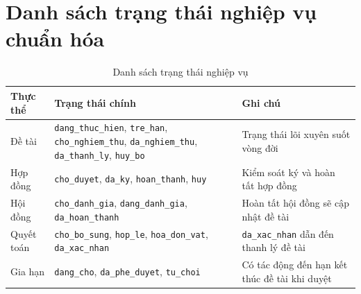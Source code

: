 \documentclass[12pt,a4paper]{report}
\begin{document}
\section{Danh sách trạng thái nghiệp vụ chuẩn hóa}
\begin{table}[H]
\centering
\begin{tabular}{|L{3.2cm}|L{4.6cm}|L{5.0cm}|}
\hline
\textbf{Thực thể} & \textbf{Trạng thái chính} & \textbf{Ghi chú} \\ \hline
Đề tài & \texttt{dang\_thuc\_hien}, \texttt{tre\_han}, \texttt{cho\_nghiem\_thu}, \texttt{da\_nghiem\_thu}, \texttt{da\_thanh\_ly}, \texttt{huy\_bo} & Trạng thái lõi xuyên suốt vòng đời \\ \hline
Hợp đồng & \texttt{cho\_duyet}, \texttt{da\_ky}, \texttt{hoan\_thanh}, \texttt{huy} & Kiểm soát ký và hoàn tất hợp đồng \\ \hline
Hội đồng & \texttt{cho\_danh\_gia}, \texttt{dang\_danh\_gia}, \texttt{da\_hoan\_thanh} & Hoàn tất hội đồng sẽ cập nhật đề tài \\ \hline
Quyết toán & \texttt{cho\_bo\_sung}, \texttt{hop\_le}, \texttt{hoa\_don\_vat}, \texttt{da\_xac\_nhan} & \texttt{da\_xac\_nhan} dẫn đến thanh lý đề tài \\ \hline
Gia hạn & \texttt{dang\_cho}, \texttt{da\_phe\_duyet}, \texttt{tu\_choi} & Có tác động đến hạn kết thúc đề tài khi duyệt \\ \hline
\end{tabular}
\caption{Danh sách trạng thái nghiệp vụ}
\end{table}
\end{document}
